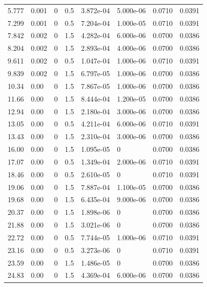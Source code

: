\documentclass[preview]{standalone}
\begin{document}
{{\begin{tabular}{L{1.2cm}C{1.2cm} C{0.3cm}C{0.5cm} C{1.4cm}C{1.4cm} C{1.4cm}C{1.4cm}}
  5.777  &  0.001  & 0     & 0.5 &  3.872e-04  & 5.000e-06  & 0.0710 &  0.0391   \\ 
  7.299  &  0.001  & 0     & 0.5 &  7.204e-04  & 1.000e-05  & 0.0710 &  0.0391   \\ 
  7.842  &  0.002  & 0     & 1.5 &  4.282e-04  & 6.000e-06  & 0.0700 &  0.0386   \\ 
  8.204  &  0.002  & 0     & 1.5 &  2.893e-04  & 4.000e-06  & 0.0700 &  0.0386   \\ 
  9.611  &  0.002  & 0     & 0.5 &  1.047e-04  & 1.000e-06  & 0.0710 &  0.0391   \\ 
  9.839  &  0.002  & 0     & 1.5 &  6.797e-05  & 1.000e-06  & 0.0700 &  0.0386   \\ 
  10.34  &  0.00  & 0     & 1.5 &  7.867e-05  & 1.000e-06  & 0.0700 &  0.0386   \\ 
  11.66  &  0.00  & 0     & 1.5 &  8.444e-04  & 1.200e-05  & 0.0700 &  0.0386   \\ 
  12.94  &  0.00  & 0     & 1.5 &  2.180e-04  & 3.000e-06  & 0.0700 &  0.0386   \\ 
  13.05  &  0.00  & 0     & 0.5 &  4.211e-04  & 6.000e-06  & 0.0710 &  0.0391   \\ 
  13.43  &  0.00  & 0     & 1.5 &  2.310e-04  & 3.000e-06  & 0.0700 &  0.0386   \\ 
  16.00  &  0.00  & 0     & 1.5 &  1.095e-05  & 0  & 0.0700 &  0.0386   \\ 
  17.07  &  0.00  & 0     & 0.5 &  1.349e-04  & 2.000e-06  & 0.0710 &  0.0391   \\ 
  18.46  &  0.00  & 0     & 0.5 &  2.610e-05  & 0  & 0.0710 &  0.0391   \\ 
  19.06  &  0.00  & 0     & 1.5 &  7.887e-04  & 1.100e-05  & 0.0700 &  0.0386   \\ 
  19.68  &  0.00  & 0     & 1.5 &  6.435e-04  & 9.000e-06  & 0.0700 &  0.0386   \\ 
  20.37  &  0.00  & 0     & 1.5 &  1.898e-06  & 0  & 0.0700 &  0.0386   \\ 
  21.88  &  0.00  & 0     & 1.5 &  3.021e-06  & 0  & 0.0700 &  0.0386   \\ 
  22.72  &  0.00  & 0     & 0.5 &  7.744e-05  & 1.000e-06  & 0.0710 &  0.0391   \\ 
  23.16  &  0.00  & 0     & 0.5 &  3.273e-06  & 0  & 0.0710 &  0.0391   \\ 
  23.59  &  0.00  & 0     & 1.5 &  1.486e-05  & 0  & 0.0700 &  0.0386   \\ 
  24.83  &  0.00  & 0     & 1.5 &  4.369e-04  & 6.000e-06  & 0.0700 &  0.0386   \\ 

\end{tabular}}}
\end{document}
